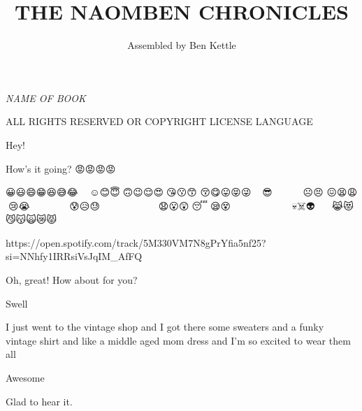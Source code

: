 \documentclass[9pt,mediumvopaper]{memoir}
\author{Assembled by Ben Kettle}
\title{THE NAOMBEN CHRONICLES}
\date{}
\newcommand{\insertextraspace}{\vspace{1.5mm}}
\newcommand{\rightmsg}[1]{
\noindent\hfill%
\begin{minipage}{0.8\textwidth}
  \begin{flushright}
    #1
  \end{flushright}
\end{minipage}
\vspace{1mm}
}
\newcommand{\leftmsg}[1]{
\noindent\begin{minipage}{0.8\textwidth}
  #1
\end{minipage}
\vspace{1mm}
}
\newcommand{\leftmsg}[2][0]{%
\noindent\begin{minipage}{0.8\textwidth}
  \ifnum#1>0
    \hspace*{5mm}\url{#2}%
  \else
    \url{#2}
  \fi
\end{minipage}
\vspace{1mm}%
}
\newcommand{\rightmsg}[2][0]{%
\noindent\hfill%
\begin{minipage}{0.8\textwidth}
  \begin{flushright}
    \ifnum#1>0
      \hspace*{-5mm}\url{#2}%
    \else
      \url{#2}
    \fi
  \end{flushright}
\end{minipage}
\vspace{1mm}%
}
\begin{document}
\let\cleardoublepage\clearpage

\maketitle






\frontmatter

\null\vfill

\begin{flushleft}
\textit{NAME OF BOOK}
\bigskip





ALL RIGHTS RESERVED OR COPYRIGHT LICENSE LANGUAGE




\end{flushleft}

\newpage
\tableofcontents 

\let\cleardoublepage\clearpage

\mainmatter


\leftmsg{Hey!}

\rightmsg{How's it going? {\emojifont 😡😡😡😡} }

{\emojifont
😀😃😄😁😆😅😂🤣🥲🥹 ☺️😊😇🙂🙃😉😌😍🥰😘😗😙 😚😋😛😝😜🤪🤨🧐🤓😎🥸 🤩🥳😏😒😞😔😟😕🙁☹️😣 😖😫😩🥺😢😭😮‍💨 😤😠😡🤬🤯😳🥵🥶😱😨 😰😥😓🫣🤗🫡🤔🫢🤭🤫 🤥😶😶‍🌫️😐😑😬🫨🫠🙄😯😦 😧😮😲🥱😴🤤😪😵😵‍💫🫥🤐🥴🤢🤮 🤧😷🤒🤕🤑🤠😈👿👹👺🤡💩👻 💀☠️👽👾🤖🎃😺😸 😹😻😼😽🙀😿😾}

\leftmsg{https://open.spotify.com/track/5M330VM7N8gPrYfia5nf25?si=NNhfy1IRRsiVsJqIM\_AfFQ}

\leftmsg{Oh, great! How about for you?}

\rightmsg{Swell}
\insertextraspace %

\rightmsg{I just went to the vintage shop and I got there some sweaters and a funky vintage shirt and like a middle aged mom dress and I'm so excited to wear them all}

\leftmsg{Awesome}

\leftmsg{Glad to hear it.}


\end{document}
